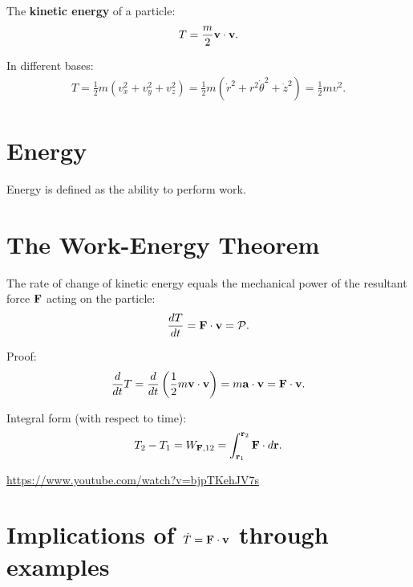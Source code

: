 \documentclass[
  letterpaper,
  DIV=11,
  numbers=noendperiod]{scrreprt}
\newcommand{\lp}{\left(}
\newcommand{\rp}{\right)}
\begin{document}
The \textbf{kinetic energy} of a particle: \begin{align}
    T = \frac{m}{2}{\bf v}\cdot{\bf v}.
\end{align}

In different bases: \begin{align*}
    T = \frac{1}{2}m(v_x^2+v_y^2+v_z^2) = \frac{1}{2}m(\dot{r}^2+r^2\dot{\theta}^2+\dot{z}^2) = \frac{1}{2}mv^2.
\end{align*}

\section{Energy}\label{energy}

Energy is defined as the ability to perform work.

\section{The Work-Energy Theorem}\label{the-work-energy-theorem}

The rate of change of kinetic energy equals the mechanical power of the
resultant force \({\bf F}\) acting on the particle: \begin{align}
    \frac{dT}{dt} = {\bf F}\cdot{\bf v} = \mathcal{P}.
\end{align}

Proof: \begin{align*}
    \frac{d}{dt}T = \frac{d}{dt}\lp\frac{1}{2}m{\bf v}\cdot{\bf v}\rp = m{\bf a}\cdot{\bf v} = {\bf F}\cdot{\bf v}.
\end{align*}

Integral form (with respect to time): \begin{align}
    T_2 - T_1 = W_{{\bf F},12} = \int_{{\bf r}_1}^{{\bf r}_2}{\bf F}\cdot d{\bf r}.
\end{align}

\url{https://www.youtube.com/watch?v=bjpTKehJV7s}

\section{\texorpdfstring{Implications of
\(\dot{T} = {\bf F}\cdot{\bf v}\) through
examples}{Implications of \textbackslash dot\{T\} = \{\textbackslash bf F\}\textbackslash cdot\{\textbackslash bf v\} through examples}}\label{implications-of-dott-bf-fcdotbf-v-through-examples}
\end{document}
